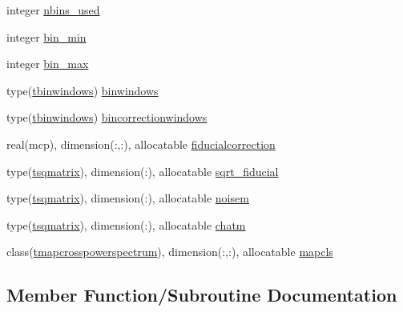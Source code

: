 \begin{DoxyCompactItemize}
integer \mbox{\hyperlink{structcmblikes_1_1tcmblikes_a779b703c8b9692b54e332ba81f5523f0}{nbins\+\_\+used}}
\item 
integer \mbox{\hyperlink{structcmblikes_1_1tcmblikes_a76fb692c80a37242f1118b63f95c8a24}{bin\+\_\+min}}
\item 
integer \mbox{\hyperlink{structcmblikes_1_1tcmblikes_a3203bc1be7c5e381dec6b7eadf755f52}{bin\+\_\+max}}
\item 
type(\mbox{\hyperlink{structcmblikes_1_1tbinwindows}{tbinwindows}}) \mbox{\hyperlink{structcmblikes_1_1tcmblikes_a206b984c4f6ffc7a80682433fcc7abb0}{binwindows}}
\item 
type(\mbox{\hyperlink{structcmblikes_1_1tbinwindows}{tbinwindows}}) \mbox{\hyperlink{structcmblikes_1_1tcmblikes_a679c42dbff11481c6b09a5bde3d7f588}{bincorrectionwindows}}
\item 
real(mcp), dimension(\+:,\+:), allocatable \mbox{\hyperlink{structcmblikes_1_1tcmblikes_a887958d10d3720c3c06b139682537889}{fiducialcorrection}}
\item 
type(\mbox{\hyperlink{structcmblikes_1_1tsqmatrix}{tsqmatrix}}), dimension(\+:), allocatable \mbox{\hyperlink{structcmblikes_1_1tcmblikes_a095d79538c8148e7f4eca4a0b72821a2}{sqrt\+\_\+fiducial}}
\item 
type(\mbox{\hyperlink{structcmblikes_1_1tsqmatrix}{tsqmatrix}}), dimension(\+:), allocatable \mbox{\hyperlink{structcmblikes_1_1tcmblikes_a2b979e1058284ba4e3a61a8117f070ff}{noisem}}
\item 
type(\mbox{\hyperlink{structcmblikes_1_1tsqmatrix}{tsqmatrix}}), dimension(\+:), allocatable \mbox{\hyperlink{structcmblikes_1_1tcmblikes_ab12f99cb4356ec770ed949abddd6fd30}{chatm}}
\item 
class(\mbox{\hyperlink{structcmblikes_1_1tmapcrosspowerspectrum}{tmapcrosspowerspectrum}}), dimension(\+:,\+:), allocatable \mbox{\hyperlink{structcmblikes_1_1tcmblikes_aad30af4e4cc58514a359e3f707a5eefe}{mapcls}}
\end{DoxyCompactItemize}


\subsection{Member Function/\+Subroutine Documentation}
\mbox{\label{structcmblikes_1_1tcmblikes_aa9b2d4b3dbc67ccf62e3688c2496a304}} 
